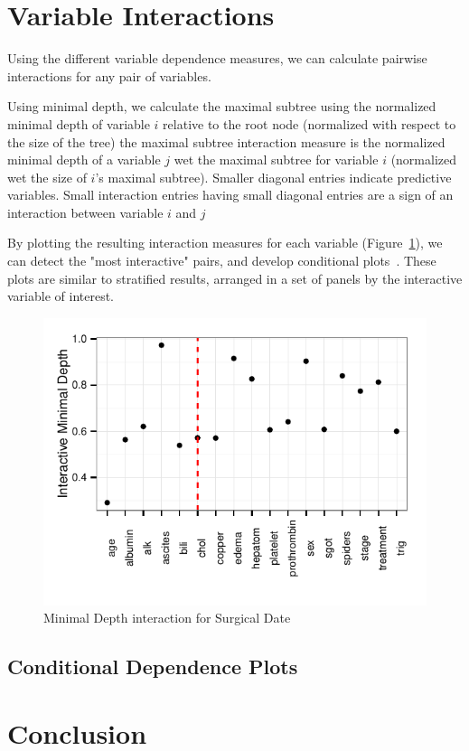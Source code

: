 \documentclass[nojss]{jss}\usepackage[]{graphicx}\usepackage[]{color}
\makeatletter
\def\maxwidth{ %
  \ifdim\Gin@nat@width>\linewidth
    \linewidth
  \else
    \Gin@nat@width
  \fi
}
\newenvironment{knitrout}{}{} %
\makeatother
\begin{document}
\section{Variable Interactions}\label{S:interactions}
Using the different variable dependence measures, we can calculate pairwise interactions for any pair of variables. 

Using minimal depth, we calculate the maximal subtree using the normalized minimal depth of variable $i$ relative to the root node (normalized with respect to the size of the tree) the maximal subtree interaction measure  is the normalized minimal depth of a variable $j$ wet the maximal subtree for variable $i$ (normalized wet the size of $i$'s maximal subtree). Smaller diagonal entries indicate predictive variables. Small interaction entries having small diagonal entries are a sign of an interaction between variable $i$ and $j$~\citep{Ishwaran_HighDimension:2010,Ishwaran_HighDimension:2011} 

By plotting the resulting interaction measures for each variable (Figure~\ref{fig:interaction}), we can detect the "most interactive" pairs, and develop conditional plots~\cite{chambers:1992,cleveland:1993}. These plots are similar to stratified results, arranged in a set of panels by the interactive variable of interest. 

\begin{knitrout}\footnotesize
{}\color{fgcolor}\begin{figure}[!htpb]

{\centering \includegraphics[width=\maxwidth]{figure/rfs-interaction-1} 

}

\caption[Minimal Depth interaction for Surgical Date]{Minimal Depth interaction for Surgical Date\label{fig:interaction}}
\end{figure}


\end{knitrout}

\subsection{Conditional Dependence Plots}



\section{Conclusion}



\end{document}
